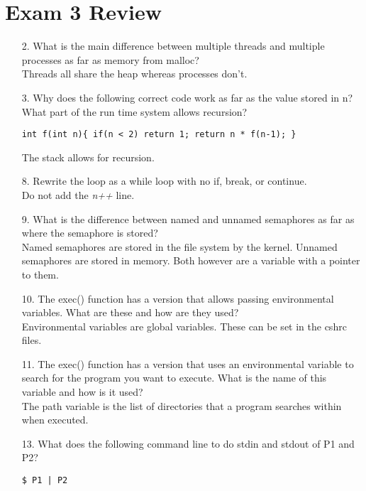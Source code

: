 \documentclass{report}
\begin{document}
\section{Exam 3 Review}
\begin{enumerate}
\item[2.] What is the main difference between multiple threads and multiple processes as far as memory from malloc?\\
Threads all share the heap whereas processes don't.

\item[3.]Why does the following correct code work as far as the value stored in n? What part of the run time system allows recursion?
\begin{verbatim}
int f(int n){ if(n < 2) return 1; return n * f(n-1); }
\end{verbatim}

The stack allows for recursion.

\item[8.]Rewrite the loop as a while loop with no if, break, or continue.\\
Do not add the \textit{n++} line.

\item[9.]What is the difference between named and unnamed semaphores as far as where the semaphore is stored?\\
Named semaphores are stored in the file system by the kernel. Unnamed semaphores are stored in memory. Both however are a variable with a pointer to them.

\item[10.]The exec() function has a version that allows passing environmental variables. What are these and how are they used?\\
Environmental variables are global variables. These can be set in the cshrc files.

\item[11.]The exec() function has a version that uses an environmental variable to search for the program you want to execute. What is the name of this variable and how is it used?\\
The path variable is the list of directories that a program searches within when executed.

\item[13.]What does the following command line to do stdin and stdout of P1 and P2?
\begin{verbatim}
$ P1 | P2
\end{verbatim}


\end{enumerate}
\end{document}
